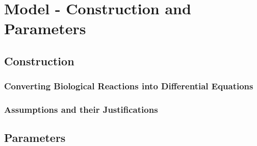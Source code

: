 \chapter{Model - Construction and Parameters}
\section{Construction}
\subsection{Converting Biological Reactions into Differential Equations}
\subsection{Assumptions and their Justifications}
\section{Parameters}